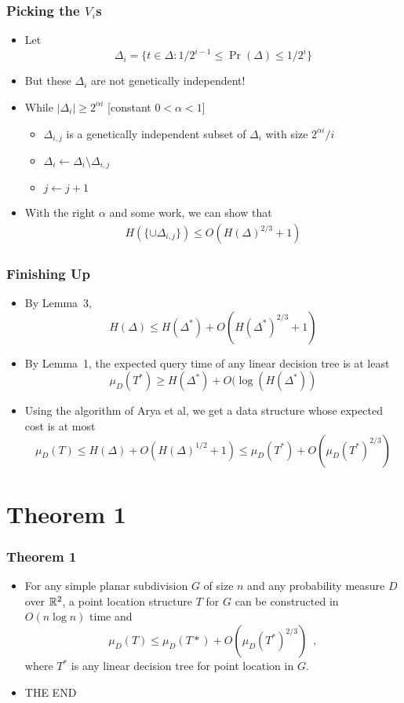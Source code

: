 \documentclass{beamer}
\begin{document}
\frame
{
	\frametitle{Picking the $V_i$s}

	\begin{itemize}
	\item<1-> Let
	\[
		\Delta_i=\{t\in \Delta :1/2^{i-1} \le \Pr(\Delta) \le 1/2^i \}
	\]
	\item<2-> But these $\Delta_i$ are not genetically independent!
 	\item<3-> While $|\Delta_i|\ge 2^{\alpha i}$  [constant $0< \alpha
< 1$]
	   \begin{itemize}
		\item $\Delta_{i,j}$ is a genetically independent subset of
			$\Delta_i$ with size $2^{\alpha i}/i$
		\item $\Delta_i\gets \Delta_i\setminus \Delta_{i,j}$
		\item $j\gets j+1$
	   \end{itemize}
	\item<4-> With the right $\alpha$ and some work, we can show that
	\begin{eqnarray*}
	H(\{\cup\Delta_{i,j}\}) \le O(H(\Delta)^{2/3}+1)
	\end{eqnarray*}
	\end{itemize}
}


\frame
{
  \frametitle{Finishing Up}
  \begin{itemize}
    \item<1-> By Lemma~3, 
     \[ H(\Delta) \le H(\Delta^*) + O(H(\Delta^*)^{2/3}+1) \]
    \item<2-> By Lemma~1, the expected query time of any linear decision tree is at least
     \[ \mu_D(T^*) \ge H(\Delta^*) + O(\log (H(\Delta^*)) \]
    \item<3-> Using the algorithm of Arya et al, we get a data
structure whose expected cost is at most
     \[ \mu_D(T) \le H(\Delta) + O(H(\Delta)^{1/2}+1) \le \mu_D(T^*) + O(\mu_D(T^*)^{2/3}) \]
  \end{itemize}
}

\section{Theorem 1}
\frame
{
	\frametitle{Theorem 1}
	\begin{itemize}
	\item<1-> For any simple planar subdivision $G$ of size $n$ and
any probability measure $D$ over $\mathbb{R}^2$, a point location structure
$T$ for $G$ can be
constructed in $O(n\log n)$ time and
\[
	\mu_D(T) \le \mu_D(T*) + O(\mu_D(T^*)^{2/3}) \enspace ,
\]
where $T^*$ is any linear decision tree for point location in $G$.
         \item<2-> \begin{center}\Huge THE END\end{center}
         \end{itemize}
}
\end{document}
